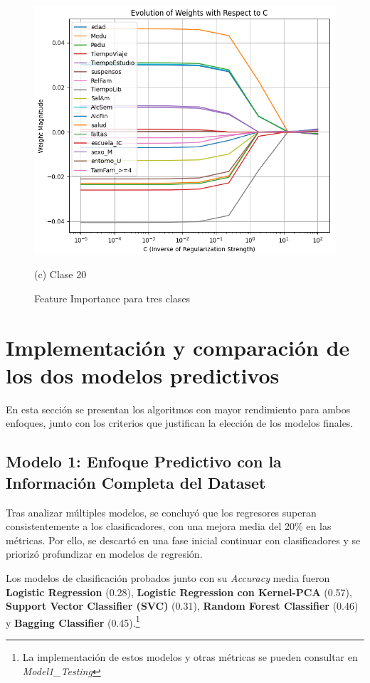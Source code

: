 \documentclass{article}
\begin{document}
\begin{figure}[h!]
\begin{minipage}[b]{0.3\textwidth}
      \centering
      \includegraphics[scale=0.3]{FI_Class20.png}
      \caption*{(c) Clase 20}
  \end{minipage}
  \caption{Feature Importance para tres clases}
\end{figure}


\section{Implementación y comparación de los dos modelos predictivos}

En esta sección se presentan los algoritmos con mayor rendimiento para ambos enfoques, junto con los criterios que justifican la elección de los modelos finales.

\subsection{Modelo 1: Enfoque Predictivo con la Información Completa del Dataset}

Tras analizar múltiples modelos, se concluyó que los regresores superan consistentemente a los clasificadores, con una mejora media del 20\% en las métricas. Por ello, se descartó en una fase inicial continuar con clasificadores y se priorizó profundizar en modelos de regresión.

Los modelos de clasificación probados junto con su \textit{Accuracy} media fueron \textbf{Logistic Regression} (0.28), \textbf{Logistic Regression con Kernel-PCA} (0.57), \textbf{Support Vector Classifier (SVC)} (0.31), \textbf{Random Forest Classifier} (0.46) y  \textbf{Bagging Classifier} (0.45).\footnote{La implementación de estos modelos y otras métricas se pueden consultar en \textit{Model1\_Testing}}
\end{document}
